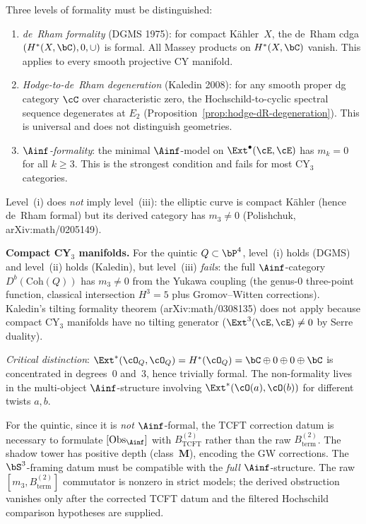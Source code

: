 \begin{remark}
\label{rem:formality-hierarchy}
Three levels of formality must be distinguished:
\begin{enumerate}[label=(\roman*)]
 \item \emph{de~Rham formality} (DGMS 1975): for compact K\"ahler~$X$, the de~Rham cdga $(H^*(X, \bC), 0, \cup)$ is formal. All Massey products on $H^*(X, \bC)$ vanish. This applies to every smooth projective CY manifold.
 \item \emph{Hodge-to-de~Rham degeneration} (Kaledin 2008): for any smooth proper dg category $\cC$ over characteristic zero, the Hochschild-to-cyclic spectral sequence degenerates at $E_2$ (Proposition~\textup{\ref{prop:hodge-dR-degeneration}}). This is universal and does not distinguish geometries.
 \item \emph{$\Ainf$-formality}: the minimal $\Ainf$-model on $\Ext^\bullet(\cE, \cE)$ has $m_k = 0$ for all $k \geq 3$. This is the strongest condition and fails for most CY$_3$ categories.
\end{enumerate}
Level~(i) does \emph{not} imply level~(iii): the elliptic curve is compact K\"ahler (hence de~Rham formal) but its derived category has $m_3 \neq 0$ (Polishchuk, arXiv:math/0205149).

\smallskip\noindent\textbf{Compact CY$_3$ manifolds.}\enspace
For the quintic $Q \subset \bP^4$, level~(i) holds (DGMS) and level~(ii) holds (Kaledin), but level~(iii) \emph{fails}: the full $\Ainf$-category $D^b(\mathrm{Coh}(Q))$ has $m_3 \neq 0$ from the Yukawa coupling (the genus-$0$ three-point function, classical intersection $H^3 = 5$ plus Gromov--Witten corrections).
Kaledin's tilting formality theorem (arXiv:math/0308135) does not apply because compact CY$_3$ manifolds have no tilting generator ($\Ext^3(\cE, \cE) \neq 0$ by Serre duality).

\emph{Critical distinction}: $\Ext^*(\cO_Q, \cO_Q) = H^*(\cO_Q) = \bC \oplus 0 \oplus 0 \oplus \bC$ is concentrated in degrees~$0$ and~$3$, hence trivially formal. The non-formality lives in the multi-object $\Ainf$-structure involving $\Ext^*(\cO(a), \cO(b))$ for different twists $a, b$.

For the quintic, since it is \emph{not} $\Ainf$-formal, the
TCFT correction datum is necessary to formulate $[\mathrm{Obs}_{\Ainf}]$
with $B^{(2)}_{\mathrm{TCFT}}$ rather than the raw
$B^{(2)}_{\mathrm{term}}$. The shadow tower has positive depth
(class~$\mathbf{M}$), encoding the GW corrections. The $\bS^3$-framing
datum must be compatible with the \emph{full} $\Ainf$-structure.
The raw $[m_3, B^{(2)}_{\mathrm{term}}]$ commutator is nonzero in
strict models; the derived obstruction vanishes only after the corrected
TCFT datum and the filtered Hochschild comparison hypotheses are supplied.
\end{remark}


